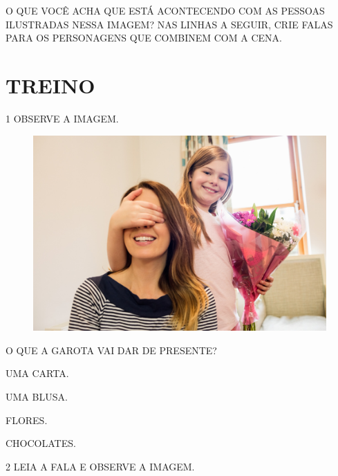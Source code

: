 O QUE VOCÊ ACHA QUE ESTÁ ACONTECENDO COM AS PESSOAS ILUSTRADAS NESSA IMAGEM? NAS LINHAS A SEGUIR, CRIE FALAS PARA OS PERSONAGENS QUE COMBINEM COM A CENA.


\section*{TREINO}


\num{1} OBSERVE A IMAGEM.

\begin{figure}[H]
\includegraphics[width=\textwidth]{media/image175b.png}
\end{figure}

O QUE A GAROTA VAI DAR DE PRESENTE?

\begin{escolha}
\item UMA CARTA.

\item UMA BLUSA.

\item FLORES.

\item CHOCOLATES.
\end{escolha}


\num{2} LEIA A FALA E OBSERVE A IMAGEM.

